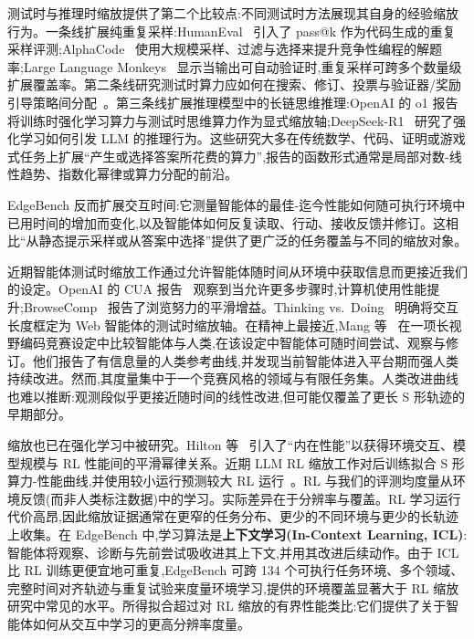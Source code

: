 测试时与推理时缩放提供了第二个比较点:不同测试时方法展现其自身的经验缩放行为。一条线扩展纯重复采样:HumanEval~\cite{chen2021humaneval} 引入了 pass@k 作为代码生成的重复采样评测;AlphaCode~\cite{li2022alphacode} 使用大规模采样、过滤与选择来提升竞争性编程的解题率;Large Language Monkeys~\cite{brown2024monkeys} 显示当输出可自动验证时,重复采样可跨多个数量级扩展覆盖率。第二条线研究测试时算力应如何在搜索、修订、投票与验证器/奖励引导策略间分配~\cite{snell2024scalingllm,wunips2024inference}。第三条线扩展推理模型中的长链思维推理:OpenAI 的 o1 报告~\cite{openaio1} 将训练时强化学习算力与测试时思维算力作为显式缩放轴;DeepSeek-R1~\cite{deepseek2025r1} 研究了强化学习如何引发 LLM 的推理行为。这些研究大多在传统数学、代码、证明或游戏式任务上扩展``产生或选择答案所花费的算力'',报告的函数形式通常是局部对数-线性趋势、指数化幂律或算力分配的前沿。

EdgeBench 反而扩展交互时间:它测量智能体的最佳-迄今性能如何随可执行环境中已用时间的增加而变化,以及智能体如何反复读取、行动、接收反馈并修订。这相比``从静态提示采样或从答案中选择''提供了更广泛的任务覆盖与不同的缩放对象。

近期智能体测试时缩放工作通过允许智能体随时间从环境中获取信息而更接近我们的设定。OpenAI 的 CUA 报告~\cite{openai2025cua} 观察到当允许更多步骤时,计算机使用性能提升;BrowseComp~\cite{wei2025browsecomp} 报告了浏览努力的平滑增益。Thinking vs.\ Doing~\cite{shen2025thinkingvsdoing} 明确将交互长度框定为 Web 智能体的测试时缩放轴。在精神上最接近,Mang 等~\cite{mang2026humansdontjustsample} 在一项长视野编码竞赛设定中比较智能体与人类,在该设定中智能体可随时间尝试、观察与修订。他们报告了有信息量的人类参考曲线,并发现当前智能体进入平台期而强人类持续改进。然而,其度量集中于一个竞赛风格的领域与有限任务集。人类改进曲线也难以推断:观测段似乎更接近随时间的线性改进,但可能仅覆盖了更长 S 形轨迹的早期部分。

缩放也已在强化学习中被研究。Hilton 等~\cite{hilton2023scalingrl} 引入了``内在性能''以获得环境交互、模型规模与 RL 性能间的平滑幂律关系。近期 LLM RL 缩放工作对后训练拟合 S 形算力-性能曲线,并使用较小运行预测较大 RL 运行~\cite{khatri2025rlart}。RL 与我们的评测均度量从环境反馈(而非人类标注数据)中的学习。实际差异在于分辨率与覆盖。RL 学习运行代价高昂,因此缩放证据通常在更窄的任务分布、更少的不同环境与更少的长轨迹上收集。在 EdgeBench 中,学习算法是\textbf{上下文学习(In-Context Learning, ICL)}:智能体将观察、诊断与先前尝试吸收进其上下文,并用其改进后续动作。由于 ICL 比 RL 训练更便宜地可重复,EdgeBench 可跨 134 个可执行任务环境、多个领域、完整时间对齐轨迹与重复试验来度量环境学习,提供的环境覆盖显著大于 RL 缩放研究中常见的水平。所得拟合超过对 RL 缩放的有界性能类比:它们提供了关于智能体如何从交互中学习的更高分辨率度量。


